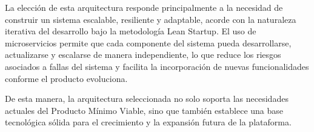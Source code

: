 La elección de esta arquitectura responde principalmente a la necesidad de construir un sistema escalable, resiliente y adaptable, acorde con la naturaleza iterativa del desarrollo bajo la metodología Lean Startup. El uso de microservicios permite que cada componente del sistema pueda desarrollarse, actualizarse y escalarse de manera independiente, lo que reduce los riesgos asociados a fallas del sistema y facilita la incorporación de nuevas funcionalidades conforme el producto evoluciona.

 De esta manera, la arquitectura seleccionada no solo soporta las necesidades actuales del Producto Mínimo Viable, sino que también establece una base tecnológica sólida para el crecimiento y la expansión futura de la plataforma.